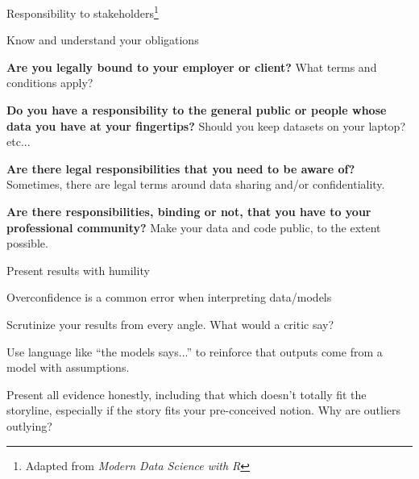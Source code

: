 \documentclass[table]{beamer}\usepackage[]{graphicx}\usepackage[]{color}
\begin{document}

\begin{frame}[fragile]{Responsibility to stakeholders\footnote{Adapted from {\em Modern Data Science with R}}}

\begin{block}{Know and understand your obligations}

\bi

  \item {\bf Are you legally bound to your employer or client?} What terms and conditions apply?
  \item {\bf Do you have a responsibility to the general public or people whose data you have at your fingertips?} Should you keep datasets on your laptop? etc...
  \item {\bf Are there legal responsibilities that you need to be aware of?} Sometimes, there are legal terms around data sharing and/or confidentiality.
  \item {\bf Are there responsibilities, binding or not, that you have to your professional community?} Make your data and code public, to the extent possible.

\ei

\end{block}

\end{frame}


\begin{frame}[fragile]{Present results with humility}

\begin{block}{Overconfidence is a common error when interpreting data/models}

\bi
  \item Scrutinize your results from every angle. What would a critic say?
  \item Use language like ``the models says...'' to reinforce that outputs come from a model with assumptions.
  \item Present all evidence honestly, including that which doesn't totally fit the storyline, especially if the story fits your pre-conceived notion. Why are outliers outlying?

\ei

\end{block}

\end{frame}


\end{document}
